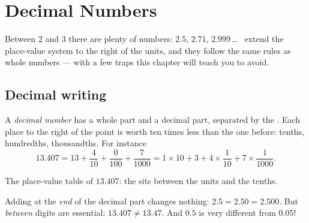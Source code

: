 \chapter{Decimal Numbers}\label{ch:g6:decimals}

Between $2$ and $3$ there are plenty of numbers: $2.5$, $2.71$,
$2.999$\,\dots\  extend the place-value system to the
right of the units, and they follow the same rules as whole numbers ---
with a few traps this chapter will teach you to avoid.

\section{Decimal writing}

\begin{definition}\label{def:g6:decimals:places}
A \emph{decimal number} has a whole part and a
decimal part, separated by the . Each place to the right
of the point is worth ten times less than the one before: tenths,
hundredths, thousandths. For instance
\[
13.407 = 13 + \frac{4}{10} + \frac{0}{100} + \frac{7}{1000}
= 1 \times 10 + 3 + 4 \times \frac{1}{10} + 7 \times \frac{1}{1000}.
\]
\end{definition}

\begin{omfigure}

{\small The place-value table of $13.407$: the  sits
between the units and the tenths.}
\end{omfigure}

\begin{remark}
Adding  at the \emph{end} of the decimal part changes nothing:
$2.5 = 2.50 = 2.500$. But  \emph{between} digits are essential:
$13.407 \neq 13.47$. And $0.5$ is very different from $0.05$!
\end{remark}


